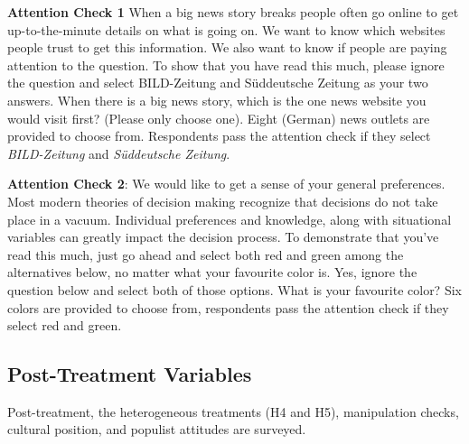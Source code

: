 \documentclass[]{article}
\begin{document}
\textbf{Attention Check 1} When a big news story breaks people often go
online to get up-to-the-minute details on what is going on. We want to
know which websites people trust to get this information. We also want
to know if people are paying attention to the question. To show that you
have read this much, please ignore the question and select BILD-Zeitung
and Süddeutsche Zeitung as your two answers. When there is a big news
story, which is the one news website you would visit first? (Please only
choose one). Eight (German) news outlets are provided to choose from.
Respondents pass the attention check if they select \emph{BILD-Zeitung}
and \emph{Süddeutsche Zeitung}.

\textbf{Attention Check 2}: We would like to get a sense of your general
preferences. Most modern theories of decision making recognize that
decisions do not take place in a vacuum. Individual preferences and
knowledge, along with situational variables can greatly impact the
decision process. To demonstrate that you've read this much, just go
ahead and select both red and green among the alternatives below, no
matter what your favourite color is. Yes, ignore the question below and
select both of those options. What is your favourite color? Six colors
are provided to choose from, respondents pass the attention check if
they select red and green.

\hypertarget{post-treatment-variables}{%
\subsection{Post-Treatment Variables}\label{post-treatment-variables}}

Post-treatment, the heterogeneous treatments (H4 and H5), manipulation
checks, cultural position, and populist attitudes are surveyed.
\end{document}
